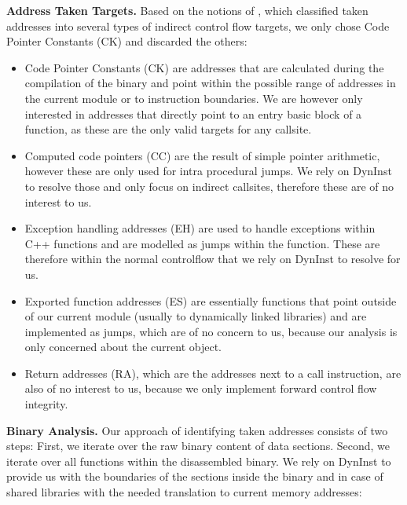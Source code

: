 \textbf{Address Taken Targets.}
Based on the notions of \cite{mingwei:sekar}, which classified taken addresses into several types of indirect control flow targets, we only chose { Code Pointer Constants (CK)} and discarded the others:
\begin{itemize}

\item { Code Pointer Constants (CK)} are addresses that are calculated during the compilation of the binary and point within the possible range of addresses in the current module or to instruction boundaries. We are however only interested in addresses that directly point to an entry basic block of a function, as these are the only valid targets for any callsite.

\item { Computed code pointers (CC)} are the result of simple pointer arithmetic, however these are only used for intra procedural jumps. We rely on DynInst to resolve those and only focus on indirect callsites, therefore these are of no interest to us.

\item{ Exception handling addresses (EH)} are used to handle exceptions within C++ functions and are modelled as jumps within the function. These are therefore within the normal controlflow that we rely on DynInst to resolve for us.

\item{ Exported function addresses (ES)} are essentially functions that point outside of our current module (usually to dynamically linked libraries) and are implemented as jumps, which are of no concern to us, because our analysis is only concerned about the current object.

\item { Return addresses (RA)}, which are the addresses next to a call instruction, are also of no interest to us, because we only implement forward { control flow integrity}.
\end{itemize}

\textbf{Binary Analysis.}
Our approach of identifying taken addresses consists of two steps: First, we iterate over the raw binary content of data sections. Second, we iterate over all functions within the disassembled binary. We rely on DynInst to provide us with the boundaries of the sections inside the binary and in case of shared libraries with the needed translation to current memory addresses:

